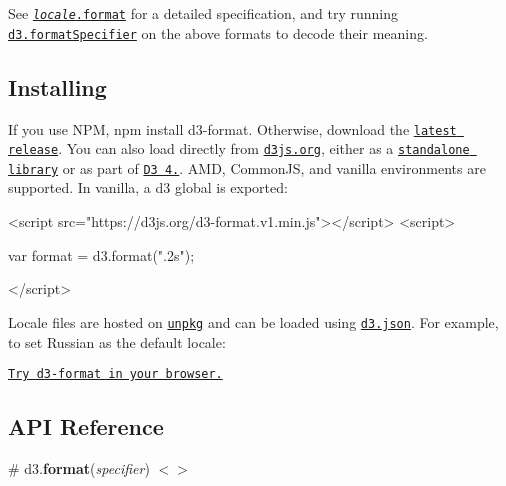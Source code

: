 See \href{#locale_format}{\tt {\itshape locale}.format} for a detailed specification, and try running \href{#formatSpecifier}{\tt d3.\+format\+Specifier} on the above formats to decode their meaning.

\subsection*{Installing}

If you use N\+PM, {\ttfamily npm install d3-\/format}. Otherwise, download the \href{https://github.com/d3/d3-format/releases/latest}{\tt latest release}. You can also load directly from \href{https://d3js.org}{\tt d3js.\+org}, either as a \href{https://d3js.org/d3-format.v1.min.js}{\tt standalone library} or as part of \href{https://github.com/d3/d3}{\tt D3 4.}. A\+MD, Common\+JS, and vanilla environments are supported. In vanilla, a {\ttfamily d3} global is exported\+:


\begin{DoxyCode}
<script src="https://d3js.org/d3-format.v1.min.js"></script>
<script>

var format = d3.format(".2s");

</script>
\end{DoxyCode}


Locale files are hosted on \href{https://unpkg.com/}{\tt unpkg} and can be loaded using \href{https://github.com/d3/d3-request/blob/master/README.md#json}{\tt d3.\+json}. For example, to set Russian as the default locale\+:




\href{https://tonicdev.com/npm/d3-format}{\tt Try d3-\/format in your browser.}

\subsection*{A\+PI Reference}

\label{_format}%
\# d3.{\bfseries format}({\itshape specifier}) \href{https://github.com/d3/d3-format/blob/master/src/defaultLocale.js#L4}{\tt $<$$>$}

